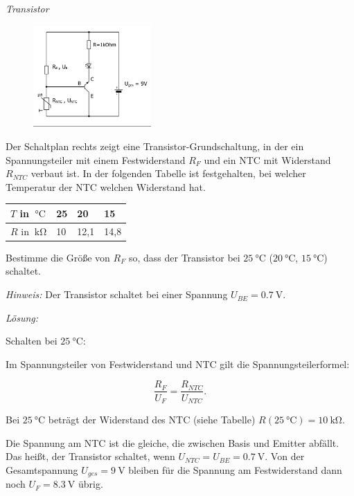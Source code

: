 \documentclass[ngerman, 11pt]{scrreprt}
\begin{document}
	\begin{aufgabe} \emph{Transistor}
		
		\begin{figure}
			\centering
			\vspace{-\baselineskip}
			\includegraphics[width=0.4\textwidth]{../Zeichnungen/schaltplan-transistor-und-ntc.png}
		\end{figure}
		Der Schaltplan rechts zeigt eine Transistor-Grundschaltung, in der ein Spannungsteiler mit einem Festwiderstand $R_F$ und ein NTC mit Widerstand $R_{NTC}$ verbaut ist. In der folgenden Tabelle ist festgehalten, bei welcher Temperatur der NTC welchen Widerstand hat.
		
		\medskip
		\begin{tabular}{l|l|l|l}
			$T$ in $\SI{}{\celsius}$ & 25 & 20 & 15 \\ \hline
			$R$ in $\SI{}{\kilo\ohm}$ & 10 & 12,1 & 14,8 \\
		\end{tabular}
		
		\medskip
		Bestimme die Größe von $R_F$ so, dass der Transistor bei $\SI{25}{\celsius}$ ($\SI{20}{\celsius}$, $\SI{15}{\celsius}$) schaltet.
		
		\emph{Hinweis:} Der Transistor schaltet bei einer Spannung $U_{BE} = \SI{0,7}{\volt}$.
	\end{aufgabe}
	
	\bigskip
	\emph{Lösung:}
	
	Schalten bei $\SI{25}{\celsius}$:
	
	Im Spannungsteiler von Festwiderstand und NTC gilt die Spannungsteilerformel:
	
	\begin{equation*}
		\frac{R_F}{U_F} = \frac{R_{NTC}}{U_{NTC}}.
	\end{equation*}
	
	Bei $\SI{25}{\celsius}$ beträgt der Widerstand des NTC (siehe Tabelle) $R(\SI{25}{\celsius}) = \SI{10}{\kilo\ohm} $.
	
	Die Spannung am NTC ist die gleiche, die zwischen Basis und Emitter abfällt. Das heißt, der Transistor schaltet, wenn $U_{NTC} = U_{BE} = \SI{0,7}{\volt}$. Von der Gesamtspannung $U_{ges}=\SI{9}{\volt}$ bleiben für die Spannung am Festwiderstand dann noch $U_F=\SI{8,3}{\volt}$ übrig.
	
\end{document}
